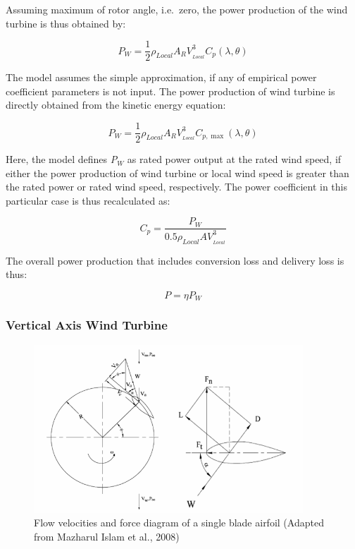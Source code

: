 Assuming maximum of rotor angle, i.e.~zero, the power production of the wind turbine is thus obtained by:

\begin{equation}
{P_W} = \frac{1}{2}{\rho_{Local}}{A_R}V_{_{Local}}^3{C_p}(\lambda ,\theta )
\end{equation}

The model assumes the simple approximation, if any of empirical power coefficient parameters is not input. The power production of wind turbine is directly obtained from the kinetic energy equation:

\begin{equation}
{P_W} = \frac{1}{2}{\rho_{Local}}{A_R}V_{_{Local}}^3{C_{p,\max }}(\lambda ,\theta )
\end{equation}

Here, the model defines \emph{P\(_{W}\)} as rated power output at the rated wind speed, if either the power production of wind turbine or local wind speed is greater than the rated power or rated wind speed, respectively. The power coefficient in this particular case is thus recalculated as:

\begin{equation}
{C_p} = \frac{{{P_W}}}{{0.5{\rho_{Local}}AV_{_{Local}}^3}}
\end{equation}

The overall power production that includes conversion loss and delivery loss is thus:

\begin{equation}
P = \eta {P_W}
\end{equation}

\subsubsection{Vertical Axis Wind Turbine}\label{vertical-axis-wind-turbine}

\begin{figure}[hbtp] %
\centering
\includegraphics[width=0.9\textwidth, height=0.9\textheight, keepaspectratio=true]{media/image7837.png}
\caption{Flow velocities and force diagram of a single blade airfoil (Adapted from Mazharul Islam et al., 2008) \protect \label{fig:flow-velocities-and-force-diagram-of-a-single}}
\end{figure}

